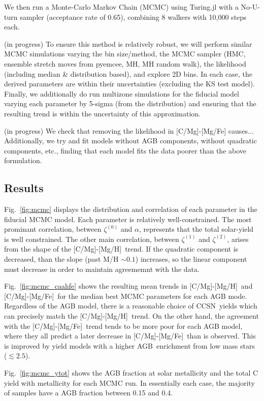 \documentclass[fleqn,
usenatbib]{mnras}
\newcommand{\agb}{AGB}
\newcommand{\cc}{CCSN}
\newcommand{\caah}{[C/Mg]-[Mg/H]}
\newcommand{\caafe}{[C/Mg]-[Mg/Fe]}
\newcommand{\zetao}{\zeta^{(0)}}
\newcommand{\zetai}{\zeta^{(1)}}
\newcommand{\zetaii}{\zeta^{(2)}}
\begin{document}
We then run a Monte-Carlo Markov Chain (MCMC) using Turing.jl with a No-U-turn sampler (acceptance rate of 0.65), combining 8 walkers with 10,000 steps each.

(in progress) To ensure this method is relatively robust, we will perform similar MCMC simulations varying the bin size/method, the MCMC sampler (HMC, ensemble stretch moves from pyemcee, MH, MH random walk), the likelihood (including median \& distribution based), and explore 2D bins. In each case, the derived parameters are within their uncertainties (excluding the KS test model). Finally, we additionally do run multizone simulations for the fiducial model varying each parameter by 5-sigma (from the distribution) and ensuring that the resulting trend is within the uncertainty of this approximation.

(in progress) We check that removing the likelihood in \caafe{} causes...
Additionally, we try and fit models without AGB components, without quadratic components, etc., finding that each model fits the data poorer than the above formulation.

\subsection{Results}

Fig.~\ref{fig:mcmc} displays the distribution and correlation of each parameter in the fiducial MCMC model. Each parameter is relatively well-constrained. The most prominant correlation, between $\zetao$ and $\alpha$, represents that the total solar-yield is well constrained. The other main correlation, between $\zetai$ and $\zetaii$, arises from the shape of the \caah\ trend. If the quadratic component is decreased, than the slope  (past M/H $\sim 0.1$) increases, so the linear component must decrease in order to maintain agreememnt with the data.

Fig.~\ref{fig:mcmc_caahfe} shows the resulting mean trends in \caah\ and \caafe\ for the median best MCMC parameters for each AGB mode. Regardless of the AGB model, there is a reasonable choice of \cc\ yields which can precisely match the \caah\ trend. On the other hand, the agreement with the \caafe\ trend tends to be more poor for each AGB model, where they all predict a later decrease in \caafe\ than is observed. This is improved by yield models with a higher \agb\ enrichment from low mass stars ($\lesssim 2.5$). 

Fig.~\ref{fig:mcmc_ytot} shows the AGB fraction at solar metallicity and the total C yield with metallicity for each MCMC run. 
In essentially each case, the majority of samples have a AGB fraction between 0.15 and 0.4. 
\end{document}
